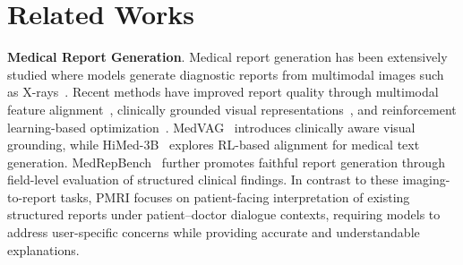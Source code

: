 \documentclass[letterpaper]{article} %
\begin{document}
\section{Related Works}
\noindent \textbf{Medical Report Generation}. 
Medical report generation has been extensively studied where models generate diagnostic reports from multimodal images such as X-rays~\cite{Li_2023_CVPR,Liu_2025_CVPR}. Recent methods have improved report quality through multimodal feature alignment~\cite{jin2024promptmrg,li2025joint}, clinically grounded visual representations~\cite{varol2025vision}, and reinforcement learning-based optimization~\cite{wang2026beyond}. 
MedVAG~\cite{varol2025vision} introduces clinically aware visual grounding, while HiMed-3B~\cite{wang2026beyond} explores RL-based alignment for medical text generation. MedRepBench~\cite{shang2025medrepbench} further promotes faithful report generation through field-level evaluation of structured clinical findings. In contrast to these imaging-to-report tasks, PMRI focuses on patient-facing interpretation of existing structured reports under patient--doctor dialogue contexts, requiring models to address user-specific concerns while providing accurate and understandable explanations. 
\end{document}
